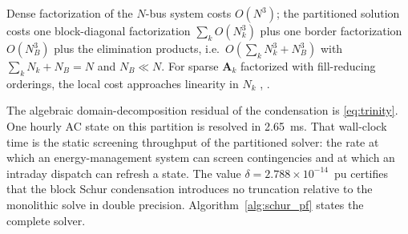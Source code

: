 \begin{proposition}[complexity]
\label{prop:complexity}
Dense factorization of the $N$-bus system costs $O(N^3)$; the partitioned solution costs one block-diagonal factorization $\sum_k O(N_k^3)$ plus one border factorization $O(N_B^3)$ plus the elimination products, i.e.\ $O\!\left(\sum_k N_k^3 + N_B^3\right)$ with $\sum_k N_k + N_B = N$ and $N_B \ll N$. For sparse $\mathbf{A}_k$ factorized with fill-reducing orderings, the local cost approaches linearity in $N_k$ \cite{george1973}, \cite{saad2003}.
\end{proposition}

The algebraic domain-decomposition residual of the condensation is \eqref{eq:trinity}. One hourly AC state on this partition is resolved in 2.65~ms. That wall-clock time is the static screening throughput of the partitioned solver: the rate at which an energy-management system can screen contingencies and at which an intraday dispatch can refresh a state. The value $\delta = 2.788 \times 10^{-14}$~pu certifies that the block Schur condensation introduces no truncation relative to the monolithic solve in double precision. Algorithm~\ref{alg:schur_pf} states the complete solver.

